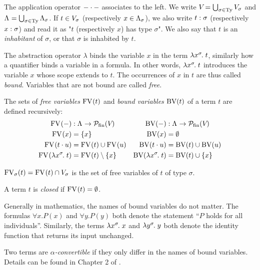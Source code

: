 The application operator $\app{-}{-}$ associates to the left. We write $\Var = \bigcup_{\sigma \in \Ty}{\Var[\sigma]}$ and $\Tm = \bigcup_{\sigma \in \Ty}{\Tm[\sigma]}$. If $t \in \Var[\sigma]$ (respectively $x \in \Tm[\sigma]$), we also write $\typedtm{t}{\sigma}$ (respectively $\typedvar{x}{\sigma}$) and read it as "$t$ (respectively $x$) has type $\sigma$". We also say that $t$ is an \emph{inhabitant} of $\sigma$, or that $\sigma$ is inhabited by $t$.

The abstraction operator $\lambda$ binds the variable $x$ in the term $\lamv{x}{\sigma}{t}$, similarly how a quantifier binds a variable in a formula. In other words, $\lamv{x}{\sigma}{t}$ introduces the variable $x$ whose scope extends to $t$. The occurrences of $x$ in $t$ are thus called \emph{bound}. Variables that are not bound are called \emph{free}.

\begin{defn} \label{def:free-and-bound-vars}
\begin{enum}
\item The sets of \emph{free variables} $\FV{t}$ and \emph{bound variables} $\BV{t}$ of a term $t$ are defined recursively:
\begin{align*}
\FV{-} &: \Tm \to \finpowset{\Var} &
    \BV{-} &: \Tm \to \finpowset{\Var} \\
\FV{x} &= \singset[x] &
    \BV{x} &= \nul \\
\FV{\app{t}{u}} &= \FV{t} \cup \FV{u} &
    \BV{\app{t}{u}} &= \BV{t} \cup \BV{u} \\
\FV{\lamv{x}{\sigma}{t}} &= \FV{t} \setminus \singset[x] &
    \BV{\lamv{x}{\sigma}{t}} &= \BV{t} \cup \singset[x]
\end{align*}
\item $\FV[\sigma]{t} = \FV{t} \cap \Var[\sigma]$ is the set of free variables of $t$ of type $\sigma$.
\item A term $t$ is \emph{closed} if $\FV{t} = \nul$.
\end{enum}
\end{defn}

Generally in mathematics, the names of bound variables do not matter. The formulas $\forall x. P(x)$ and $\forall y. P(y)$ both denote the statement ``$P$ holds for all individuals''. Similarly, the terms $\lamv{x}{\sigma}{x}$ and $\lamv{y}{\sigma}{y}$ both denote the identity function that returns its input unchanged.

\begin{defn}
Two terms are \emph{$\alpha$-convertible} if they only differ in the names of bound variables. Details can be found in Chapter 2 of \cite{barendregt:1984}.
\end{defn}

